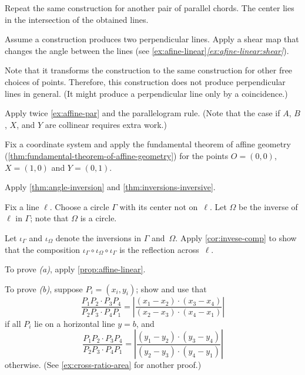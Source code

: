 \begin{multicols}{2}
Repeat the same construction for another pair of parallel chords.
The center lies in the intersection of the obtained lines.

Assume a construction produces two perpendicular lines.
Apply a shear map that changes the angle between the lines (see \ref{ex:afine-linear}\textit{\ref{ex:afine-linear:shear}}).

Note that it transforms the construction to the same construction for other free choices of points.
Therefore, this construction does not produce perpendicular lines in general.
(It might produce a perpendicular line only by a coincidence.)
 
Apply twice \ref{ex:affine-par} and the parallelogram rule.
(Note that the case if $A$, $B$, $X$, and $Y$ are collinear requires extra work.)
 
Fix a coordinate system and apply the fundamental theorem of affine geometry (\ref{thm:fundamental-theorem-of-affine-geometry}) for the points $O=(0,0)$, $X=(1,0)$ and $Y=(0,1)$.
 
Apply \ref{thm:angle-inversion} and \ref{thm:inversions-inversive}.
 
Fix a line $\ell$.
Choose a circle $\Gamma$ with its center not on~$\ell$.
Let $\Omega$ be the inverse of $\ell$ in $\Gamma$;
note that $\Omega$ is a circle.

Let $\iota_\Gamma$ and $\iota_\Omega$ denote the inversions in $\Gamma$ and~$\Omega$.
Apply \ref{cor:invese-comp} to show that the composition 
$\iota_\Gamma\circ\iota_\Omega\circ\iota_\Gamma$
is the reflection across~$\ell$.

\setcounter{eqtn}{0}

To prove \textit{(a)}, apply \ref{prop:affine-linear}.

To prove \textit{(b)}, suppose $P_i=(x_i,y_i)$;
show and use that 
\[\frac{P_1P_2\cdot P_3P_4}{P_2P_3\cdot P_4P_1}
=\left|\frac{(x_1-x_2)\cdot(x_3-x_4)}{(x_2-x_3)\cdot (x_4-x_1)}\right|\]
if all $P_i$ lie on a horizontal line $y=b$, and
\[\frac{P_1P_2\cdot P_3P_4}{P_2P_3\cdot P_4P_1}
=\left|\frac{(y_1-y_2)\cdot(y_3-y_4)}{(y_2-y_3)\cdot (y_4-y_1)}\right|\]
otherwise. (See \ref{ex:cross-ratio-area} for another proof.)



\end{multicols}
